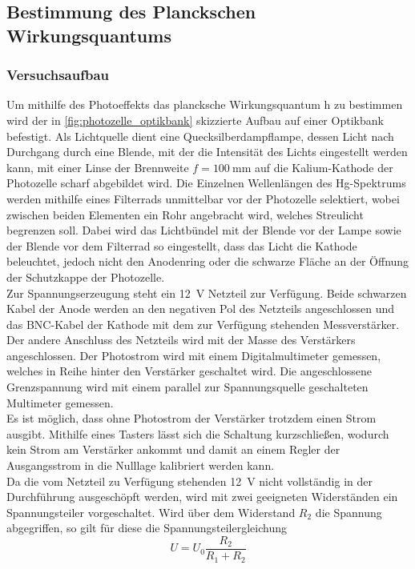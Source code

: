 \subsection{Bestimmung des Planckschen Wirkungsquantums}
\subsubsection{Versuchsaufbau}
Um mithilfe des Photoeffekts\cite[S.78-80]{Demtröder:829119} das plancksche Wirkungsquantum h zu bestimmen wird der
in \cref{fig:photozelle_optikbank} skizzierte Aufbau auf einer Optikbank befestigt.
Als Lichtquelle dient eine Quecksilberdampflampe, dessen Licht nach Durchgang durch eine
Blende, mit der die Intensität des Lichts eingestellt werden kann,
mit einer Linse der Brennweite $f=\SI{100}{\milli\meter}$ auf die Kalium-Kathode
der Photozelle scharf abgebildet wird. Die Einzelnen Wellenlängen des Hg-Spektrums
werden mithilfe eines Filterrads unmittelbar vor der Photozelle selektiert,
wobei zwischen beiden Elementen ein Rohr angebracht wird, welches Streulicht
begrenzen soll. Dabei wird das Lichtbündel mit der Blende vor der Lampe sowie der Blende vor
dem Filterrad so eingestellt, dass das Licht die Kathode beleuchtet, jedoch nicht
den Anodenring oder die schwarze Fläche an der Öffnung der Schutzkappe der Photozelle.\\

Zur Spannungserzeugung steht ein \SI{12}{\volt} Netzteil zur Verfügung. Beide schwarzen
Kabel der Anode werden an den negativen Pol des Netzteils angeschlossen und
das BNC-Kabel der Kathode mit dem zur Verfügung stehenden Messverstärker.
Der andere Anschluss des Netzteils wird mit der Masse des Verstärkers angeschlossen.
Der Photostrom wird mit einem Digitalmultimeter gemessen, welches in Reihe hinter
den Verstärker geschaltet wird.
Die angeschlossene Grenzspannung wird mit einem parallel zur Spannungsquelle
geschalteten Multimeter gemessen.\\

Es ist möglich, dass ohne Photostrom der Verstärker trotzdem einen Strom ausgibt.
Mithilfe eines Tasters lässt sich die Schaltung kurzschließen, wodurch kein Strom
am Verstärker ankommt und damit an einem Regler der Ausgangsstrom in die Nulllage
kalibriert werden kann.\\

Da die vom Netzteil zu Verfügung stehenden \SI{12}{\volt} nicht vollständig in der Durchführung
ausgeschöpft werden, wird mit zwei geeigneten Widerständen ein Spannungsteiler
vorgeschaltet. Wird über dem Widerstand $R_2$ die Spannung abgegriffen, so gilt für diese
die Spannungsteilergleichung
\begin{equation}
	U = U_0\frac{R_2}{R_1 + R_2}
	\label{eq:spannungsteiler}
\end{equation}



